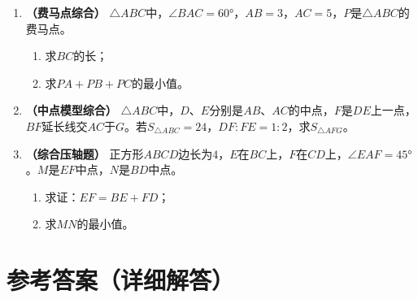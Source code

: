\documentclass[12pt, a4paper]{ctexart}
\begin{document}
\begin{enumerate}[label=\textbf{【题\arabic*】}, leftmargin=2em]
\item \textbf{（费马点综合）}
$\triangle ABC$中，$\angle BAC = 60°$，$AB = 3$，$AC = 5$，$P$是$\triangle ABC$的费马点。
\begin{enumerate}[label=(\arabic*)]
  \item 求$BC$的长；
  \item 求$PA + PB + PC$的最小值。
\end{enumerate}

\item \textbf{（中点模型综合）}
$\triangle ABC$中，$D$、$E$分别是$AB$、$AC$的中点，$F$是$DE$上一点，$BF$延长线交$AC$于$G$。若$S_{\triangle ABC} = 24$，$DF:FE = 1:2$，求$S_{\triangle AFG}$。

\item \textbf{（综合压轴题）}
正方形$ABCD$边长为$4$，$E$在$BC$上，$F$在$CD$上，$\angle EAF = 45°$。$M$是$EF$中点，$N$是$BD$中点。
\begin{enumerate}[label=(\arabic*)]
  \item 求证：$EF = BE + FD$；
  \item 求$MN$的最小值。
\end{enumerate}

\end{enumerate}

\newpage
\section*{\textcolor{apppurple}{参考答案（详细解答）}}
\end{document}
